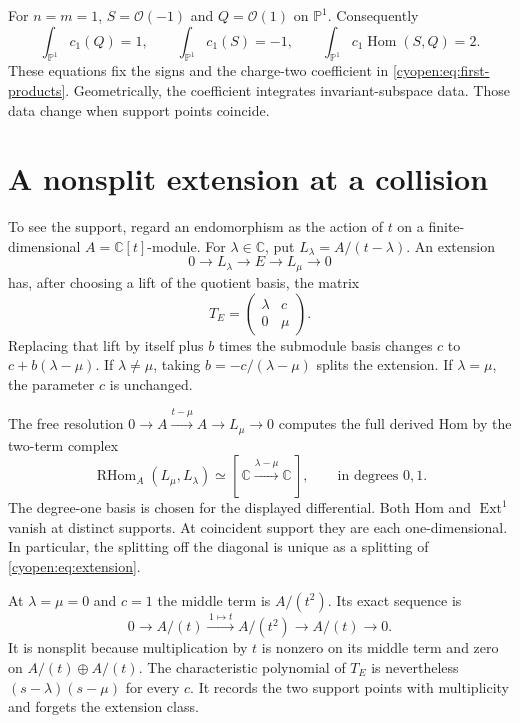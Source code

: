 For $n=m=1$, $S=\mathcal O(-1)$ and $Q=\mathcal O(1)$
on $\mathbb P^1$. Consequently
\[
 \int_{\mathbb P^1}c_1(Q)=1,\qquad
 \int_{\mathbb P^1}c_1(S)=-1,\qquad
 \int_{\mathbb P^1}c_1\operatorname{Hom}(S,Q)=2.
\]
These equations fix the signs and the charge-two coefficient in
\eqref{cyopen:eq:first-products}. Geometrically, the coefficient
integrates invariant-subspace data. Those data change when support
points coincide.

\section{A nonsplit extension at a collision}

To see the support, regard an endomorphism as the action of $t$
on a finite-dimensional $A=\mathbb C[t]$-module.
For $\lambda\in\mathbb C$, put $L_\lambda=A/(t-\lambda)$.
An extension
\begin{equation}\label{cyopen:eq:extension}
 0\longrightarrow L_\lambda\longrightarrow E
 \longrightarrow L_\mu\longrightarrow0
\end{equation}
has, after choosing a lift of the quotient basis, the matrix
\[
 T_E=\begin{pmatrix}\lambda&c\\0&\mu\end{pmatrix}.
\]
Replacing that lift by itself plus $b$ times the submodule basis
changes $c$ to $c+b(\lambda-\mu)$.
If $\lambda\ne\mu$, taking $b=-c/(\lambda-\mu)$ splits the
extension. If $\lambda=\mu$, the parameter $c$ is unchanged.

The free resolution
$0\to A\xrightarrow{t-\mu}A\to L_\mu\to0$
computes the full derived Hom by the two-term complex
\begin{equation}\label{cyopen:eq:hom-complex}
 \operatorname{RHom}_A(L_\mu,L_\lambda)\simeq
 [\,\mathbb C\xrightarrow{\lambda-\mu}\mathbb C\,],
 \qquad\text{in degrees }0,1.
\end{equation}
The degree-one basis is chosen for the displayed differential.
Both Hom and $\operatorname{Ext}^1$ vanish at distinct supports.
At coincident support they are each one-dimensional.
In particular, the splitting off the diagonal is unique as a
splitting of \eqref{cyopen:eq:extension}.

At $\lambda=\mu=0$ and $c=1$ the middle term is $A/(t^2)$.
Its exact sequence is
\begin{equation}\label{cyopen:eq:jordan-extension}
 0\longrightarrow A/(t)
 \xrightarrow{\,1\mapsto t\,}A/(t^2)
 \longrightarrow A/(t)\longrightarrow0.
\end{equation}
It is nonsplit because multiplication by $t$ is nonzero on its
middle term and zero on $A/(t)\oplus A/(t)$.
The characteristic polynomial of $T_E$ is nevertheless
$(s-\lambda)(s-\mu)$ for every $c$.
It records the two support points with multiplicity and forgets
the extension class.

